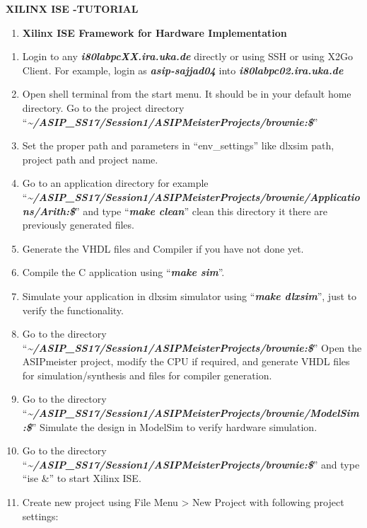 \documentclass[
]{article}
\author{}
\date{}
\begin{document}
\textbf{XILINX ISE -TUTORIAL}

\begin{enumerate}
\def\labelenumi{\Alph{enumi}.}
\item
  \textbf{Xilinx ISE Framework for Hardware Implementation}
\end{enumerate}

\begin{enumerate}
\def\labelenumi{\arabic{enumi}.}
\item
  Login to any \emph{\textbf{i80labpcXX.ira.uka.de}} directly or using
  SSH or using X2Go Client. For example, login as
  \emph{\textbf{asip-sajjad04}} into
  \emph{\textbf{i80labpc02.ira.uka.de}}
\item
  Open shell terminal from the start menu. It should be in your default
  home directory. Go to the project directory
  ``\emph{\textbf{\textasciitilde/ASIP\_SS17/Session1/ASIPMeisterProjects/brownie:\$}}''
\item
  Set the proper path and parameters in ``env\_settings'' like dlxsim
  path, project path and project name.
\item
  Go to an application directory for example
  ``\emph{\textbf{\textasciitilde/ASIP\_SS17/Session1/ASIPMeisterProjects/brownie/Applications/Arith:\$}}''
  and type ``\emph{\textbf{make clean}}'' clean this directory it there
  are previously generated files.
\item
  Generate the VHDL files and Compiler if you have not done yet.
\item
  Compile the C application using ``\emph{\textbf{make sim}}''.
\item
  Simulate your application in dlxsim simulator using
  ``\emph{\textbf{make dlxsim}}'', just to verify the functionality.
\item
  Go to the directory
  ``\emph{\textbf{\textasciitilde/ASIP\_SS17/Session1/ASIPMeisterProjects/brownie:\$}}''
  Open the ASIPmeister project, modify the CPU if required, and generate
  VHDL files for simulation/synthesis and files for compiler generation.
\item
  Go to the directory
  ``\emph{\textbf{\textasciitilde/ASIP\_SS17/Session1/ASIPMeisterProjects/brownie/ModelSim:\$}}''
  Simulate the design in ModelSim to verify hardware simulation.
\item
  Go to the directory
  ``\emph{\textbf{\textasciitilde/ASIP\_SS17/Session1/ASIPMeisterProjects/brownie:\$}}''
  and type ``ise \&'' to start Xilinx ISE.
\item
  Create new project using File Menu \textgreater{} New Project with
  following project settings:
\end{enumerate}
\end{document}
